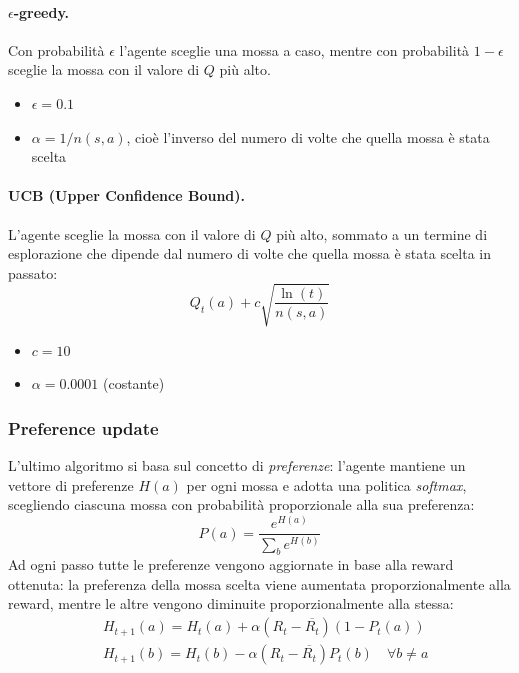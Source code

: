\paragraph{$\epsilon$-greedy.} Con probabilità $\epsilon$ l'agente sceglie una mossa a caso, mentre con probabilità $1-\epsilon$ sceglie la mossa con il valore di $Q$ più alto.
\begin{infobox}[Parametri]
\begin{itemize}[nosep]
    \item $\epsilon = 0.1$
    \item $\alpha = 1/n(s,a)$, cioè l'inverso del numero di volte che quella mossa è stata scelta
\end{itemize}
\end{infobox}

\paragraph{UCB (Upper Confidence Bound).} L'agente sceglie la mossa con il valore di $Q$ più alto, sommato a un termine di esplorazione che dipende dal numero di volte che quella mossa è stata scelta in passato:
\[
Q_t(a) + c\sqrt{\frac{\ln(t)}{n(s,a)}}
\]
\begin{infobox}[Parametri]
\begin{itemize}[nosep]
    \item $c = 10$
    \item $\alpha = 0.0001$ (costante)
\end{itemize}
\end{infobox}

\subsubsection{Preference update}
L'ultimo algoritmo si basa sul concetto di \emph{preferenze}: l'agente mantiene un vettore di preferenze $H(a)$ per ogni mossa e adotta una politica \emph{softmax}, scegliendo ciascuna mossa con probabilità proporzionale alla sua preferenza:
\[
P(a) = \frac{e^{H(a)}}{\sum_{b} e^{H(b)}}
\]
Ad ogni passo tutte le preferenze vengono aggiornate in base alla reward ottenuta: la preferenza della mossa scelta viene aumentata proporzionalmente alla reward, mentre le altre vengono diminuite proporzionalmente alla stessa:
\begin{align}
    &H_{t+1}(a)=H_t(a) + \alpha (R_t - \overline{R_t})(1-P_t(a)) \\
    &H_{t+1}(b)=H_t(b) - \alpha (R_t - \overline{R_t})P_t(b) \quad \forall b\neq a
\end{align}

